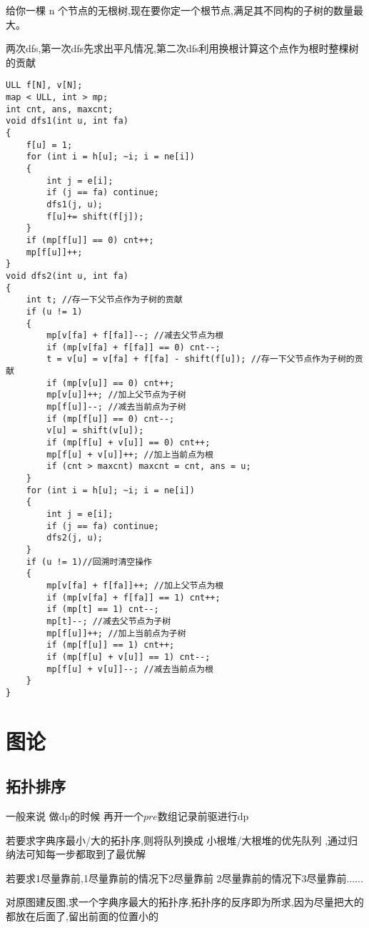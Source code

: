 \documentclass[a4paper,fontset=none]{ctexart}
\begin{document}
给你一棵 n 个节点的无根树,现在要你定一个根节点,满足其不同构的子树的数量最大。

两次dfs,第一次dfs先求出平凡情况,第二次dfs利用换根计算这个点作为根时整棵树的贡献

\begin{verbatim}
ULL f[N], v[N];
map < ULL, int > mp;
int cnt, ans, maxcnt;
void dfs1(int u, int fa)
{
    f[u] = 1;
    for (int i = h[u]; ~i; i = ne[i])
    {
        int j = e[i];
        if (j == fa) continue;
        dfs1(j, u);
        f[u]+= shift(f[j]);
    }
    if (mp[f[u]] == 0) cnt++;
    mp[f[u]]++;
}
void dfs2(int u, int fa)
{
    int t; //存一下父节点作为子树的贡献
    if (u != 1)
    {
        mp[v[fa] + f[fa]]--; //减去父节点为根
        if (mp[v[fa] + f[fa]] == 0) cnt--;
        t = v[u] = v[fa] + f[fa] - shift(f[u]); //存一下父节点作为子树的贡献
        if (mp[v[u]] == 0) cnt++;
        mp[v[u]]++; //加上父节点为子树
        mp[f[u]]--; //减去当前点为子树
        if (mp[f[u]] == 0) cnt--;
        v[u] = shift(v[u]);
        if (mp[f[u] + v[u]] == 0) cnt++;
        mp[f[u] + v[u]]++; //加上当前点为根
        if (cnt > maxcnt) maxcnt = cnt, ans = u;
    }
    for (int i = h[u]; ~i; i = ne[i])
    {
        int j = e[i];
        if (j == fa) continue;
        dfs2(j, u);
    }
    if (u != 1)//回溯时清空操作
    {
        mp[v[fa] + f[fa]]++; //加上父节点为根
        if (mp[v[fa] + f[fa]] == 1) cnt++;
        if (mp[t] == 1) cnt--;
        mp[t]--; //减去父节点为子树
        mp[f[u]]++; //加上当前点为子树
        if (mp[f[u]] == 1) cnt++;
        if (mp[f[u] + v[u]] == 1) cnt--;
        mp[f[u] + v[u]]--; //减去当前点为根
    }
}
\end{verbatim}

\section{图论}
\subsection{拓扑排序}
一般来说 做dp的时候 再开一个$pre$数组记录前驱进行dp

若要求字典序最小/大的拓扑序,则将队列换成 小根堆/大根堆的优先队列 ,通过归纳法可知每一步都取到了最优解

若要求1尽量靠前,1尽量靠前的情况下2尽量靠前  2尽量靠前的情况下3尽量靠前......

对原图建反图,求一个字典序最大的拓扑序,拓扑序的反序即为所求,因为尽量把大的都放在后面了,留出前面的位置小的
\end{document}
